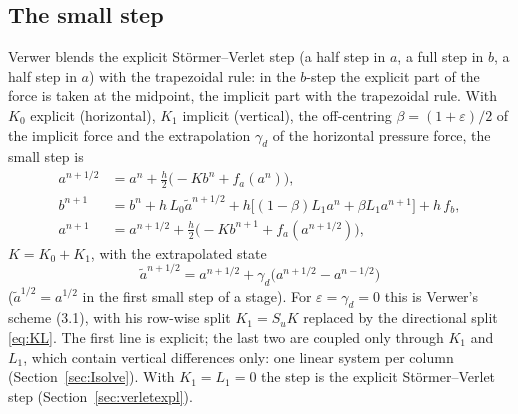 \documentclass[11pt,a4paper]{article}
\begin{document}
\subsection{The small step}
Verwer \cite{verwer} blends the explicit Störmer--Verlet step (a half step in $a$, a full step in $b$, a
half step in $a$) with the trapezoidal rule: in the $b$-step the explicit part of the force is taken at
the midpoint, the implicit part with the trapezoidal rule. With $K_0$ explicit (horizontal), $K_1$ implicit
(vertical), the off-centring $\beta=(1+\varepsilon)/2$ of the implicit force and the extrapolation $\gamma_d$ of the horizontal
pressure force, the small step is
\begin{align}
a^{n+1/2}&=a^n+\tfrac h2\big(-Kb^n+f_a(a^n)\big),\nonumber\\
b^{n+1}&=b^n+h\,L_0\tilde a^{n+1/2}+h\big[(1-\beta)L_1a^n+\beta L_1a^{n+1}\big]+h\,f_b,\label{eq:CS}\\
a^{n+1}&=a^{n+1/2}+\tfrac h2\big(-Kb^{n+1}+f_a(a^{n+1/2})\big),\nonumber
\end{align}
$K=K_0+K_1$, with the extrapolated state
\begin{equation}
\tilde a^{n+1/2}=a^{n+1/2}+\gamma_d\big(a^{n+1/2}-a^{n-1/2}\big)\label{eq:extra}
\end{equation}
($\tilde a^{1/2}=a^{1/2}$ in the first small step of a stage). For $\varepsilon=\gamma_d=0$ this is Verwer's scheme (3.1), with his
row-wise split $K_1=S_uK$ replaced by the directional split \eqref{eq:KL}. The first line is explicit; the last two
are coupled only through $K_1$ and $L_1$, which contain vertical differences only: one linear system per
column (Section~\ref{sec:Isolve}). With $K_1=L_1=0$ the step is the explicit Störmer--Verlet step (Section~\ref{sec:verletexpl}).
\end{document}
